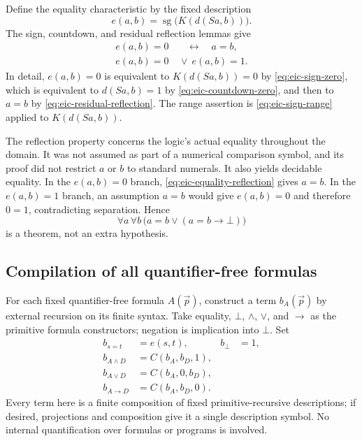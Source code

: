\documentclass[11pt,letterpaper]{article}
\theoremstyle{definition}\newtheorem{definition}[theorem]{Definition}
\theoremstyle{remark}\newtheorem{remark}[theorem]{Remark}
\begin{document}
Define the equality characteristic by the fixed description
\begin{equation}
 e(a,b)=\operatorname{sg}\bigl(K(d(Sa,b))\bigr).
 \label{eq:eic-equality-characteristic}
\end{equation}
The sign, countdown, and residual reflection lemmas give
\begin{align}
 e(a,b)=0&\quad\longleftrightarrow\quad a=b,
       \label{eq:eic-equality-reflection}\\
 e(a,b)=0&\ \lor\ e(a,b)=1.
       \label{eq:eic-equality-range}
\end{align}
In detail, $e(a,b)=0$ is equivalent to $K(d(Sa,b))=0$ by
\eqref{eq:eic-sign-zero}, which is equivalent to $d(Sa,b)=1$ by
\eqref{eq:eic-countdown-zero}, and then to $a=b$ by
\eqref{eq:eic-residual-reflection}.  The range assertion is
\eqref{eq:eic-sign-range} applied to $K(d(Sa,b))$.

The reflection property concerns the logic's actual equality throughout
the domain.  It was not assumed as part of a numerical comparison symbol,
and its proof did not restrict $a$ or $b$ to standard numerals.
It also yields decidable equality.  In the $e(a,b)=0$ branch,
\eqref{eq:eic-equality-reflection} gives $a=b$.  In the $e(a,b)=1$
branch, an assumption $a=b$ would give $e(a,b)=0$ and therefore $0=1$,
contradicting separation.  Hence
\begin{equation}
 \forall a\,\forall b\,\bigl(a=b\lor(a=b\to\bot)\bigr)
 \label{eq:eic-equality-decidable}
\end{equation}
is a theorem, not an extra hypothesis.

\subsection{Compilation of all quantifier-free formulas}

For each fixed quantifier-free formula $A(\vec p)$, construct a term
$b_A(\vec p)$ by external recursion on its finite syntax.  Take equality,
$\bot$, $\land$, $\lor$, and $\to$ as the primitive formula constructors;
negation is implication into $\bot$.  Set
\begin{align}
 b_{s=t}&=e(s,t), & b_{\bot}&=1,\label{eq:eic-boolean-atoms}\\
 b_{A\land D}&=C(b_A,b_D,1),\label{eq:eic-boolean-and}\\
 b_{A\lor D}&=C(b_A,0,b_D),\label{eq:eic-boolean-or}\\
 b_{A\to D}&=C(b_A,b_D,0).\label{eq:eic-boolean-implies}
\end{align}
Every term here is a finite composition of fixed primitive-recursive
descriptions; if desired, projections and composition give it a single
description symbol.  No internal quantification over formulas or programs
is involved.
\end{document}
